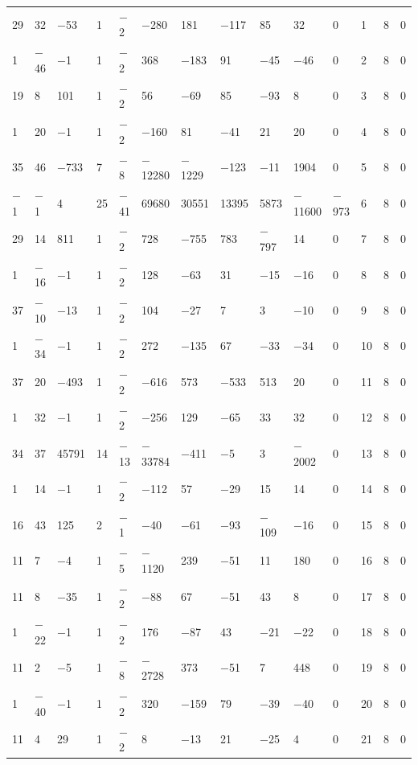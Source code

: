 \documentclass[10pt,a4paper]{amsart}
\numberwithin{equation}{section}
\theoremstyle{definition}
\numberwithin{table}{section}
\begin{document}
{\begin{paracol}{3}
\begin{supertabular}{|w{c}{.32cm}w{c}{.32cm}w{c}{.32cm}@{\hspace{.5cm}}w{c}{.2cm}w{c}{.2cm}|@{\hspace{\tabcolsep}}HHHHHHw{c}{.17cm}w{c}{.17cm}w{c}{.17cm}|}
			29 & 32 & $-$53 & 1 & $-$2 & $-$280 & 181 & $-$117 & 85 & 32 & 0 & 1 & 8 & 0 \\
			1 & $-$46 & $-$1 & 1 & $-$2 & 368 & $-$183 & 91 & $-$45 & $-$46 & 0 & 2 & 8 & 0 \\
			19 & 8 & 101 & 1 & $-$2 & 56 & $-$69 & 85 & $-$93 & 8 & 0 & 3 & 8 & 0 \\
			1 & 20 & $-$1 & 1 & $-$2 & $-$160 & 81 & $-$41 & 21 & 20 & 0 & 4 & 8 & 0 \\
			35 & 46 & $-$733 & 7 & $-$8 & $-$12280 & $-$1229 & $-$123 & $-$11 & 1904 & 0 & 5 & 8 & 0 \\
			$-$1 & $-$1 & 4 & 25 & $-$41 & 69680 & 30551 & 13395 & 5873 & $-$11600 & $-$973 & 6 & 8 & 0 \\
			29 & 14 & 811 & 1 & $-$2 & 728 & $-$755 & 783 & $-$797 & 14 & 0 & 7 & 8 & 0 \\
			1 & $-$16 & $-$1 & 1 & $-$2 & 128 & $-$63 & 31 & $-$15 & $-$16 & 0 & 8 & 8 & 0 \\
			37 & $-$10 & $-$13 & 1 & $-$2 & 104 & $-$27 & 7 & 3 & $-$10 & 0 & 9 & 8 & 0 \\
			1 & $-$34 & $-$1 & 1 & $-$2 & 272 & $-$135 & 67 & $-$33 & $-$34 & 0 & 10 & 8 & 0 \\
			37 & 20 & $-$493 & 1 & $-$2 & $-$616 & 573 & $-$533 & 513 & 20 & 0 & 11 & 8 & 0 \\
			1 & 32 & $-$1 & 1 & $-$2 & $-$256 & 129 & $-$65 & 33 & 32 & 0 & 12 & 8 & 0 \\
			34 & 37 & 45791 & 14 & $-$13 & $-$33784 & $-$411 & $-$5 & 3 & $-$2002 & 0 & 13 & 8 & 0 \\
			1 & 14 & $-$1 & 1 & $-$2 & $-$112 & 57 & $-$29 & 15 & 14 & 0 & 14 & 8 & 0 \\
			16 & 43 & 125 & 2 & $-$1 & $-$40 & $-$61 & $-$93 & $-$109 & $-$16 & 0 & 15 & 8 & 0 \\
			11 & 7 & $-$4 & 1 & $-$5 & $-$1120 & 239 & $-$51 & 11 & 180 & 0 & 16 & 8 & 0 \\
			11 & 8 & $-$35 & 1 & $-$2 & $-$88 & 67 & $-$51 & 43 & 8 & 0 & 17 & 8 & 0 \\
			1 & $-$22 & $-$1 & 1 & $-$2 & 176 & $-$87 & 43 & $-$21 & $-$22 & 0 & 18 & 8 & 0 \\
			11 & 2 & $-$5 & 1 & $-$8 & $-$2728 & 373 & $-$51 & 7 & 448 & 0 & 19 & 8 & 0 \\
			1 & $-$40 & $-$1 & 1 & $-$2 & 320 & $-$159 & 79 & $-$39 & $-$40 & 0 & 20 & 8 & 0 \\
			11 & 4 & 29 & 1 & $-$2 & 8 & $-$13 & 21 & $-$25 & 4 & 0 & 21 & 8 & 0 \\

\end{supertabular}
\end{paracol}}
\end{document}
